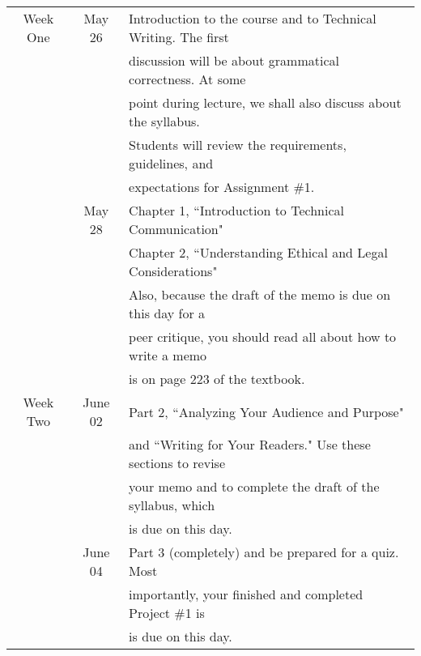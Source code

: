 \documentclass[9pt]{article}
\begin{document}
\begin{enumerate}
         \begin{center}
            \begin{tabular}{@{}|c|c|l|@{}}
               \hline Week One & May 26 & Introduction to the course and to
               Technical Writing. The first \\ \cline{2-3}
               & & discussion will be about grammatical
               correctness. At some \\ \cline{2-3} 
               & & point during lecture, we shall also discuss
               about the syllabus. \\ \cline{2-3} 
               & & Students will review the requirements,
               guidelines, and \\ \cline{2-3}
               & & expectations for Assignment \#1. \\ \hline
               & May 28 & Chapter 1, ``Introduction to Technical Communication"\\ \cline{2-3} 
               & & Chapter 2, ``Understanding Ethical and Legal Considerations" \\ \cline{2-3} 
               & & Also, because the draft of the memo is due on this day for a \\ \cline{2-3} 
               & & peer critique, you should read all about how to write a memo  \\ \cline{2-3}
               & & is on page 223 of the textbook.\\ \hline
               Week Two & June 02 & Part 2, ``Analyzing Your Audience and Purpose"\\ \cline{2-3}
               & & and ``Writing for Your Readers." Use these sections to revise \\ \cline{2-3}
               & & your memo and to complete the draft of the syllabus, which \\ \cline{2-3}
               & & is due on this day.\\ \hline
               & June 04 & Part 3 (completely) and be prepared for a quiz. Most \\ \cline{2-3}
               & & importantly, your finished and completed Project \#1 is \\ \cline{2-3}
               & & is due on this day. \\ \hline
            \end{tabular}
         \end{center}
         
\end{enumerate}
\end{document}
